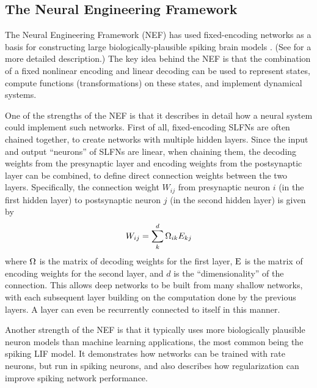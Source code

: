 \subsection{The Neural Engineering Framework}


The Neural Engineering Framework (NEF) \parencite{Eliasmith1999,Eliasmith2003}
has used fixed-encoding networks as a basis
for constructing large biologically-plausible spiking brain models
\parencite[\eg/][]{Eliasmith2012}.
(See  for a more detailed description.)
The key idea behind the NEF is that the combination of
a fixed nonlinear encoding and linear decoding
can be used to represent states,
compute functions (transformations) on these states,
and implement dynamical systems.

One of the strengths of the NEF is that it describes in detail
how a neural system could implement such networks.
First of all, fixed-encoding SLFNs are often chained together,
to create networks with multiple hidden layers.
Since the input and output ``neurons'' of SLFNs are linear,
when chaining them, the decoding weights from the presynaptic layer
and encoding weights from the postsynaptic layer can be combined,
to define direct connection weights between the two layers.
Specifically, the connection weight $W_{ij}$
from presynaptic neuron $i$ (in the first hidden layer)
to postsynaptic neuron $j$ (in the second hidden layer)
is given by
\begin{align}
  W_{ij} = \sum_k^d \Omega_{ik} E_{kj}
\end{align}
where $\Omega$ is the matrix of decoding weights for the first layer,
$\mathrm{E}$ is the matrix of encoding weights for the second layer,
and $d$ is the ``dimensionality'' of the connection.
This allows deep networks to be built from many shallow networks,
with each subsequent layer building on the computation done by the previous layers.
A layer can even be recurrently connected to itself in this manner.

Another strength of the NEF is that it typically uses
more biologically plausible neuron models
than machine learning applications,
the most common being the spiking LIF model.
It demonstrates how networks can be trained with rate neurons,
but run in spiking neurons,
and also describes how regularization can improve spiking network performance.

